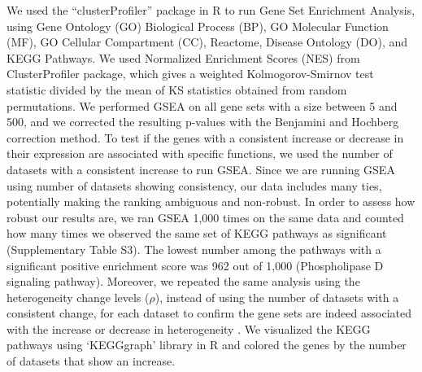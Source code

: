 \documentclass[12pt,twoside]{unicam}
\begin{document}
We used the ``clusterProfiler'' package in R to run Gene Set Enrichment Analysis, using Gene Ontology (GO) Biological Process (BP), GO Molecular Function (MF), GO Cellular Compartment (CC), Reactome, Disease Ontology (DO), and KEGG Pathways. We used Normalized Enrichment Scores (NES) from ClusterProfiler package, which gives a weighted Kolmogorov-Smirnov test statistic divided by the mean of KS statistics obtained from random permutations. We performed GSEA on all gene sets with a size between 5 and 500, and we corrected the resulting p-values with the Benjamini and Hochberg correction method. To test if the genes with a consistent increase or decrease in their expression are associated with specific functions, we used the number of datasets with a consistent increase to run GSEA. Since we are running GSEA using number of datasets showing consistency, our data includes many ties, potentially making the ranking ambiguous and non-robust. In order to assess how robust our results are, we ran GSEA 1,000 times on the same data and counted how many times we observed the same set of KEGG pathways as significant (Supplementary Table S3). The lowest number among the pathways with a significant positive enrichment score was 962 out of 1,000 (Phospholipase D signaling pathway). Moreover, we repeated the same analysis using the heterogeneity change levels (\(\rho\)), instead of using the number of datasets with a consistent change, for each dataset to confirm the gene sets are indeed associated with the increase or decrease in heterogeneity
. We visualized the KEGG pathways using `KEGGgraph' library in R and colored the genes by the number of datasets that show an increase.
\end{document}
